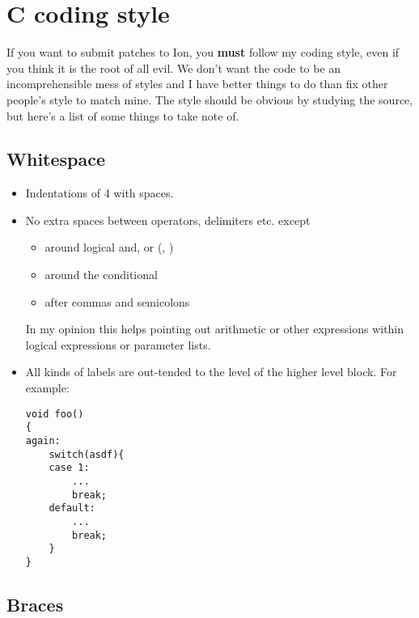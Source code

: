 \section{C coding style}

If you want to submit patches to Ion, you \textbf{must} follow my coding 
style, even if you think it is the root of all evil. We don't want
the code to be an incomprehensible mess of styles and I have better
things to do than fix other people's style to match mine. The style
should be obvious by studying the source, but here's a list of some
things to take note of.

\subsection{Whitespace}

\begin{itemize}
  \item Indentations of 4 with spaces.
    
  \item No extra spaces between operators, delimiters etc. except
    \begin{itemize}
      \item around logical and, or (\code{&&}, \code{||})
      \item around the conditional 
      \item after commas and semicolons
    \end{itemize}  
    In my opinion this helps pointing out arithmetic or other
    expressions within logical expressions or parameter lists.
    
  \item All kinds of labels are out-tended to the level of the higher
    level block. For example:

\begin{verbatim}    
void foo()
{
again:
    switch(asdf){
    case 1:
        ...
        break;
    default:
        ...
        break;
    }
}
\end{verbatim}
\end{itemize}

\subsection{Braces}

